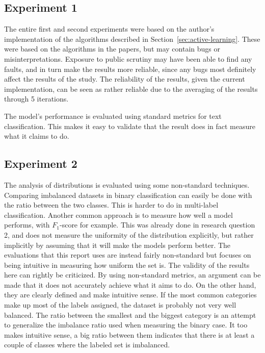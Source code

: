\subsection{Experiment 1}

The entire first and second experiments were based on the author's implementation of the algorithms described in Section~\ref{sec:active-learning}.
These were based on the algorithms in the papers, but may contain bugs or misinterpretations.
Exposure to public scrutiny may have been able to find any faults, and in turn make the results more reliable, since any bugs most definitely affect the results of the study.
The reliability of the results, given the current implementation, can be seen as rather reliable due to the averaging of the results through 5 iterations.

The model's performance is evaluated using standard metrics for text classification.
This makes it easy to validate that the result does in fact measure what it claims to do.

\subsection{Experiment 2}

The analysis of distributions is evaluated using some non-standard techniques.
Comparing imbalanced datasets in binary classification can easily be done with the ratio between the two classes.
This is harder to do in multi-label classification. 
Another common approach is to measure how well a model performs, with $F_1$-score for example.
This was already done in research question 2, and does not measure the uniformity of the distribution explicitly, but rather implicitly by assuming that it will make the models perform better.
The evaluations that this report uses are instead fairly non-standard but focuses on being intuitive in measuring how uniform the set is.
The validity of the results here can rightly be criticized.
By using non-standard metrics, an argument can be made that it does not accurately achieve what it aims to do.
On the other hand, they are clearly defined and make intuitive sense.
If the most common categories make up most of the labels assigned, the dataset is probably not very well balanced.
The ratio between the smallest and the biggest category is an attempt to generalize the imbalance ratio used when measuring the binary case.
It too makes intuitive sense, a big ratio between them indicates that there is at least a couple of classes where the labeled set is imbalanced.

